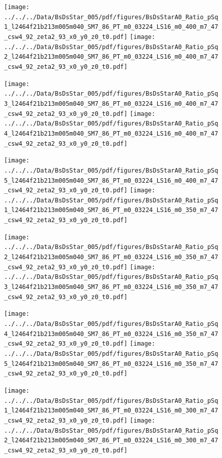 \documentclass[a4paper,10pt]{article}
\begin{document}
\begin{figure}[p]
 \texttt{[image: ../../../Data/BsDsStar\_005/pdf/figures/BsDsStarA0\_Ratio\_pSq1\_l2464f21b213m005m040\_SM7\_86\_PT\_m0\_03224\_LS16\_m0\_400\_m7\_47\_csw4\_92\_zeta2\_93\_x0\_y0\_z0\_t0.pdf]} 
 \texttt{[image: ../../../Data/BsDsStar\_005/pdf/figures/BsDsStarA0\_Ratio\_pSq2\_l2464f21b213m005m040\_SM7\_86\_PT\_m0\_03224\_LS16\_m0\_400\_m7\_47\_csw4\_92\_zeta2\_93\_x0\_y0\_z0\_t0.pdf]} 
 \end{figure}
\begin{figure}[p]
 \texttt{[image: ../../../Data/BsDsStar\_005/pdf/figures/BsDsStarA0\_Ratio\_pSq3\_l2464f21b213m005m040\_SM7\_86\_PT\_m0\_03224\_LS16\_m0\_400\_m7\_47\_csw4\_92\_zeta2\_93\_x0\_y0\_z0\_t0.pdf]} 
 \texttt{[image: ../../../Data/BsDsStar\_005/pdf/figures/BsDsStarA0\_Ratio\_pSq4\_l2464f21b213m005m040\_SM7\_86\_PT\_m0\_03224\_LS16\_m0\_400\_m7\_47\_csw4\_92\_zeta2\_93\_x0\_y0\_z0\_t0.pdf]} 
 \end{figure}
\begin{figure}[p]
 \texttt{[image: ../../../Data/BsDsStar\_005/pdf/figures/BsDsStarA0\_Ratio\_pSq5\_l2464f21b213m005m040\_SM7\_86\_PT\_m0\_03224\_LS16\_m0\_400\_m7\_47\_csw4\_92\_zeta2\_93\_x0\_y0\_z0\_t0.pdf]} 
 \texttt{[image: ../../../Data/BsDsStar\_005/pdf/figures/BsDsStarA0\_Ratio\_pSq1\_l2464f21b213m005m040\_SM7\_86\_PT\_m0\_03224\_LS16\_m0\_350\_m7\_47\_csw4\_92\_zeta2\_93\_x0\_y0\_z0\_t0.pdf]} 
 \end{figure}
\clearpage
\begin{figure}[p]
 \texttt{[image: ../../../Data/BsDsStar\_005/pdf/figures/BsDsStarA0\_Ratio\_pSq2\_l2464f21b213m005m040\_SM7\_86\_PT\_m0\_03224\_LS16\_m0\_350\_m7\_47\_csw4\_92\_zeta2\_93\_x0\_y0\_z0\_t0.pdf]} 
 \texttt{[image: ../../../Data/BsDsStar\_005/pdf/figures/BsDsStarA0\_Ratio\_pSq3\_l2464f21b213m005m040\_SM7\_86\_PT\_m0\_03224\_LS16\_m0\_350\_m7\_47\_csw4\_92\_zeta2\_93\_x0\_y0\_z0\_t0.pdf]} 
 \end{figure}
\begin{figure}[p]
 \texttt{[image: ../../../Data/BsDsStar\_005/pdf/figures/BsDsStarA0\_Ratio\_pSq4\_l2464f21b213m005m040\_SM7\_86\_PT\_m0\_03224\_LS16\_m0\_350\_m7\_47\_csw4\_92\_zeta2\_93\_x0\_y0\_z0\_t0.pdf]} 
 \texttt{[image: ../../../Data/BsDsStar\_005/pdf/figures/BsDsStarA0\_Ratio\_pSq5\_l2464f21b213m005m040\_SM7\_86\_PT\_m0\_03224\_LS16\_m0\_350\_m7\_47\_csw4\_92\_zeta2\_93\_x0\_y0\_z0\_t0.pdf]} 
 \end{figure}
\begin{figure}[p]
 \texttt{[image: ../../../Data/BsDsStar\_005/pdf/figures/BsDsStarA0\_Ratio\_pSq1\_l2464f21b213m005m040\_SM7\_86\_PT\_m0\_03224\_LS16\_m0\_300\_m7\_47\_csw4\_92\_zeta2\_93\_x0\_y0\_z0\_t0.pdf]} 
 \texttt{[image: ../../../Data/BsDsStar\_005/pdf/figures/BsDsStarA0\_Ratio\_pSq2\_l2464f21b213m005m040\_SM7\_86\_PT\_m0\_03224\_LS16\_m0\_300\_m7\_47\_csw4\_92\_zeta2\_93\_x0\_y0\_z0\_t0.pdf]} 
 \end{figure}
\end{document}
